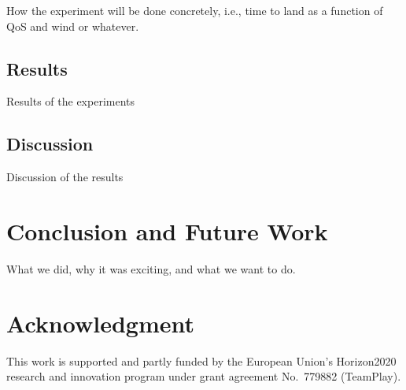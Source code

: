 \documentclass[conference]{IEEEtran}
\begin{document}
How the experiment will be done concretely, i.e., time to land as a
function of QoS and wind or whatever.

\subsection{Results}

Results of the experiments

\subsection{Discussion}

Discussion of the results

\section{Conclusion and Future Work}
\label{sec:conclusion}

What we did, why it was exciting, and what we want to do.

\section*{Acknowledgment}

This work is supported and partly funded by the European Union’s Horizon2020 research and innovation program under grant agreement No.~779882 (TeamPlay).


 
\vspace{1ex}
\end{document}
